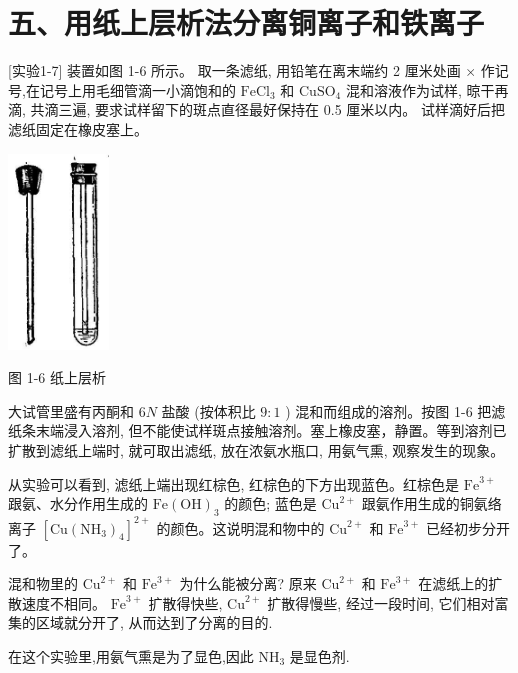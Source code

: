 \documentclass[10pt]{article}
\begin{document}
\section*{五、用纸上层析法分离铜离子和铁离子}

[实验1-7] 装置如图 1-6 所示。 取一条滤纸, 用铅笔在离末端约 2 厘米处画 \(\times\) 作记号,在记号上用毛细管滴一小滴饱和的 \({\mathrm{{FeCl}}}_{3}\) 和 \({\mathrm{{CuSO}}}_{4}\) 混和溶液作为试样, 晾干再滴, 共滴三遍, 要求试样留下的斑点直径最好保持在 0.5 厘米以内。 试样滴好后把滤纸固定在橡皮塞上。

\begin{center}
\includegraphics[max width=0.2\textwidth]{images/01912d16-be99-77bb-9535-4f3ed8d9946f_38_653582.jpg}
\end{center}

图 1-6 纸上层析

大试管里盛有丙酮和 \({6N}\) 盐酸 (按体积比 \(9 : 1\) ) 混和而组成的溶剂。按图 1-6 把滤纸条末端浸入溶剂, 但不能使试样斑点接触溶剂。塞上橡皮塞，静置。等到溶剂已扩散到滤纸上端时, 就可取出滤纸, 放在浓氨水瓶口, 用氨气熏, 观察发生的现象。

从实验可以看到, 滤纸上端出现红棕色, 红棕色的下方出现蓝色。红棕色是 \({\mathrm{{Fe}}}^{3 + }\) 跟氨、水分作用生成的 \(\mathrm{{Fe}}{\left( \mathrm{{OH}}\right) }_{3}\) 的颜色; 蓝色是 \({\mathrm{{Cu}}}^{2 + }\) 跟氨作用生成的铜氨络离子 \({\left\lbrack \mathrm{{Cu}}{\left( {\mathrm{{NH}}}_{3}\right) }_{4}\right\rbrack }^{2 + }\) 的颜色。这说明混和物中的 \({\mathrm{{Cu}}}^{2 + }\) 和 \({\mathrm{{Fe}}}^{3 + }\) 已经初步分开了。

混和物里的 \({\mathrm{{Cu}}}^{2 + }\) 和 \({\mathrm{{Fe}}}^{3 + }\) 为什么能被分离? 原来 \({\mathrm{{Cu}}}^{2 + }\) 和 \({\mathrm{{Fe}}}^{3 + }\) 在滤纸上的扩散速度不相同。 \({\mathrm{{Fe}}}^{3 + }\) 扩散得快些, \({\mathrm{{Cu}}}^{2 + }\) 扩散得慢些, 经过一段时间, 它们相对富集的区域就分开了, 从而达到了分离的目的.

在这个实验里,用氨气熏是为了显色,因此 \({\mathrm{{NH}}}_{3}\) 是显色剂.
\end{document}

